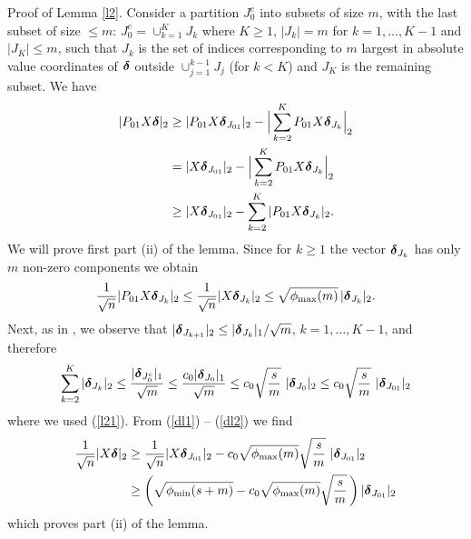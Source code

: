 \documentclass[dvips,aos]{imsart}
\numberwithin{equation}{section}
\theoremstyle{plain}
\newcommand{\bD}{\mbox{\boldmath$\delta$}}
\begin{document}
{\sc Proof of Lemma \ref{l2}}. Consider a partition $J_0^c$ into
subsets of size $m$, with the last subset of size $\le m$:
$J_0^c=\cup_{k=1}^K J_k$ where $K\ge 1$, $|J_k|=m$ for
$k=1,\dots,K-1$ and $|J_K|\le m$, such that $J_k$ is the set of
indices corresponding to $m$ largest in absolute value coordinates
of $\bD$ outside $\cup_{j=1}^{k-1} J_j$ (for $k<K$) and $J_K$ is the
remaining subset. We have
\begin{equation}\begin{split}\label{dl1}
|P_{01} X \bD|_2&\ge |P_{01} X \bD_{J_{01}}|_2 - \Big|\sum_{k=2}^K
P_{01} X \bD_{J_{k}}\Big|_2
\\
%
&= |X \bD_{J_{01}}|_2 - \Big|\sum_{k=2}^K P_{01} X
\bD_{J_{k}}\Big|_2\\  &\ge|X \bD_{J_{01}}|_2 - \sum_{k=2}^K |P_{01}
X \bD_{J_{k}}|_2.
\end{split}\end{equation}
We will prove first part (ii) of the lemma. Since for $k\ge1$ the
vector $\bD_{J_{k}}$ has only $m$ non-zero components we obtain
\begin{equation}\begin{split}\label{dl*}
\frac{1}{\sqrt{n}}|P_{01} X \bD_{J_{k}}|_2 \le\frac{1}{\sqrt{n}}| X
\bD_{J_{k}}|_2 \le \sqrt{\phi_{\max}(m)}\,|\bD_{J_{k}}|_2.
\end{split}\end{equation}
 Next, as in \cite{ct07}, we observe
that $|\bD_{J_{k+1}}|_2\le |\bD_{J_{k}}|_1/\sqrt{m}$,
$k=1,\dots,K-1$, and therefore
\begin{equation}\label{dl2}
\begin{split}
\sum_{k=2}^K |\bD_{J_{k}}|_2 \le \frac{|\bD_{J_{0}^c}|_1}{\sqrt{m}}
\le \frac{c_0|\bD_{J_{0}}|_1}{\sqrt{m}} \le c_0 \sqrt{\frac{s}{m}}\
|\bD_{J_{0}}|_2 \le c_0 \sqrt{\frac{s}{m}}\ |\bD_{J_{01}}|_2
\end{split}
\end{equation}
where we used (\ref{l21}). From (\ref{dl1}) -- (\ref{dl2}) we find
\begin{equation*}%
\begin{split}
\frac{1}{\sqrt{n}}|X \bD|_2&\ge  \frac{1}{\sqrt{n}}|X
\bD_{J_{01}}|_2 - c_0 \sqrt{\phi_{\max}(m)}\sqrt{\frac{s}{m}}\
|\bD_{J_{01}}|_2
\\
&\ge \left(\sqrt{\phi_{\min}(s+m)}-c_0
\sqrt{\phi_{\max}(m)}\sqrt{\frac{s}{m}}\,\right)|\bD_{J_{01}}|_2
\end{split}
\end{equation*}
which proves part (ii) of the lemma.
\end{document}
